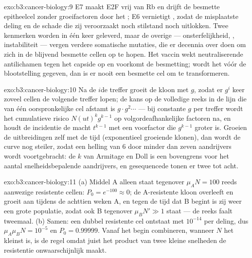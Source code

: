\begin{solution}{exo:b3:cancer-biology:9}
E7 maakt E2F vrij van Rb en drijft de besmette epitheelcel zonder
groeifactoren door het ; E6 vernietigt , zodat de
misplaatste deling en de schade die zij veroorzaakt noch stilstand noch
 uitlokken. Twee kenmerken worden in één keer geleverd, maar de
overige --- onsterfelijkheid, , instabiliteit --- vergen verdere
somatische mutaties, die er decennia over doen om zich in de blijvend
besmette cellen op te hopen. Het vaccin wekt neutraliserende
antilichamen tegen het capside op en voorkomt de besmetting; wordt het
vóór de blootstelling gegeven, dan is er nooit een besmette cel om te
transformeren.
\end{solution}

\begin{solution}{exo:b3:cancer-biology:10}
Na de $i$de treffer groeit de kloon met $g$, zodat er $g^{i}$ keer
zoveel cellen de volgende treffer lopen; de kans op de volledige reeks
in de lijn die van één oorspronkelijke cel afstamt is
$g\cdot g^{2}\cdots$ --- bij constante $g$ per treffer wordt het
cumulatieve risico $N(ut)^{k}
g^{k-1}$ op volgordeafhankelijke factoren na, en houdt de incidentie de
macht $t^{k-1}$ met een voorfactor die $g^{k-1}$ groter is. Groeien de
uitbreidingen zelf met de tijd (exponentieel groeiende klonen), dan
wordt de curve nog steiler, zodat een helling van $6$ door minder dan
zeven aandrijvers wordt voortgebracht: de $k$ van Armitage en Doll is
een bovengrens voor het aantal snelheidsbepalende aandrijvers, en
gesequencede  tonen er twee tot acht.
\end{solution}

\begin{solution}{exo:b3:cancer-biology:11}
(a) Middel A alleen staat tegenover $\mu_{A}N = 100$ reeds aanwezige
resistente cellen: $P_{0} = e^{-100} \approx 0$; de A-resistente kloon
overleeft en groeit aan tijdens de achttien weken A, en tegen de tijd
dat B begint is zij weer een grote populatie, zodat ook B tegenover
$\mu_{B}N' \gg 1$ staat --- de reeks faalt tweemaal. (b) Samen: een
dubbel resistente cel ontstaat met $10^{-14}$ per deling, dus
$\mu_{A}\mu_{B}N = 10^{-5}$ en $P_{0} =
0.99999$. Vanaf het begin combineren, wanneer $N$ het kleinst is, is de
regel omdat juist het product van twee kleine snelheden de resistentie
onwaarschijnlijk maakt.
\end{solution}

